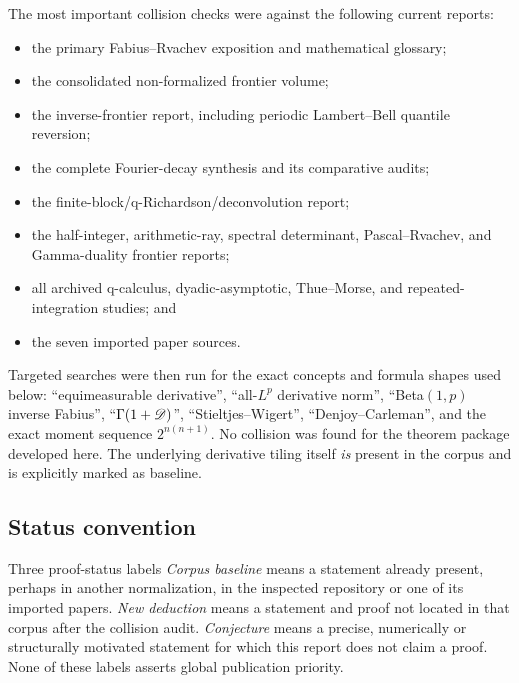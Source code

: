 \documentclass[11pt,oneside]{article}
\theoremstyle{definition}
\theoremstyle{remark}
\begin{document}
The most important collision checks were against the following current reports:
\begin{itemize}
\item the primary Fabius--Rvachev exposition and mathematical glossary;
\item the consolidated non-formalized frontier volume;
\item the inverse-frontier report, including periodic Lambert--Bell quantile reversion;
\item the complete Fourier-decay synthesis and its comparative audits;
\item the finite-block/q-Richardson/deconvolution report;
\item the half-integer, arithmetic-ray, spectral determinant, Pascal--Rvachev, and
      Gamma-duality frontier reports;
\item all archived q-calculus, dyadic-asymptotic, Thue--Morse, and repeated-integration
      studies; and
\item the seven imported paper sources.
\end{itemize}

Targeted searches were then run for the exact concepts and formula shapes used below:
``equimeasurable derivative'', ``all-$L^p$ derivative norm'', ``Beta$(1,p)$ inverse
Fabius'', ``$\Gamma(1+\mathscr D)$'', ``Stieltjes--Wigert'', ``Denjoy--Carleman'', and the exact
moment sequence $2^{n(n+1)}$.  No collision was found for the theorem package developed here.
The underlying derivative tiling itself \emph{is} present in the corpus and is explicitly
marked as baseline.

\subsection{Status convention}

\begin{statusbox}{Three proof-status labels}
\emph{Corpus baseline} means a statement already present, perhaps in another normalization,
in the inspected repository or one of its imported papers.  \emph{New deduction} means a
statement and proof not located in that corpus after the collision audit.  \emph{Conjecture}
means a precise, numerically or structurally motivated statement for which this report does
not claim a proof.  None of these labels asserts global publication priority.
\end{statusbox}
\end{document}
